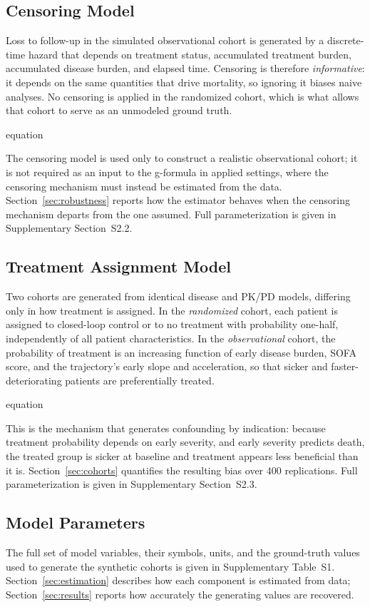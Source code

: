 \subsection{Censoring Model}
\label{subsec:censoring_model}
Loss to follow-up in the simulated observational cohort is generated by a discrete-time hazard that
depends on treatment status, accumulated treatment burden, accumulated disease burden, and elapsed
time. Censoring is therefore \emph{informative}: it depends on the same quantities that drive
mortality, so ignoring it biases naive analyses. No censoring is applied in the randomized cohort,
which is what allows that cohort to serve as an unmodeled ground truth.

equation

The censoring model is used only to construct a realistic observational cohort; it is not required
as an input to the g-formula in applied settings, where the censoring mechanism must instead be
estimated from the data. Section~\ref{sec:robustness} reports how the estimator behaves when the
censoring mechanism departs from the one assumed. Full parameterization is given in Supplementary
Section~S2.2.

\subsection{Treatment Assignment Model}
\label{sec:TreatmentAssignment}
Two cohorts are generated from identical disease and PK/PD models, differing only in how treatment is
assigned. In the \emph{randomized} cohort, each patient is assigned to closed-loop control or to no
treatment with probability one-half, independently of all patient characteristics. In the
\emph{observational} cohort, the probability of treatment is an increasing function of early disease
burden, SOFA score, and the trajectory's early slope and acceleration, so that sicker and
faster-deteriorating patients are preferentially treated.

equation

This is the mechanism that generates confounding by indication: because treatment probability depends
on early severity, and early severity predicts death, the treated group is sicker at baseline and
treatment appears less beneficial than it is. Section~\ref{sec:cohorts} quantifies the resulting bias
over 400 replications. Full parameterization is given in Supplementary Section~S2.3.

\subsection{Model Parameters}
The full set of model variables, their symbols, units, and the ground-truth values used to generate
the synthetic cohorts is given in Supplementary Table~S1. Section~\ref{sec:estimation} describes how
each component is estimated from data; Section~\ref{sec:results} reports how accurately the
generating values are recovered.

